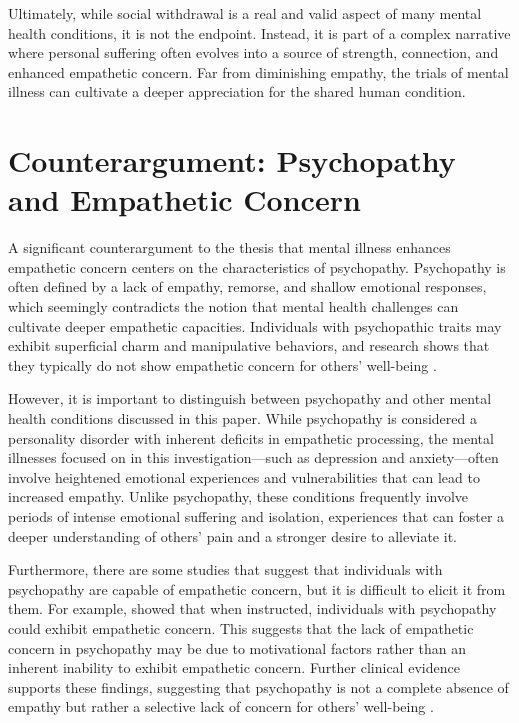 \documentclass[stu]{apa7}
\begin{document}
Ultimately, while social withdrawal is a real and valid aspect of many mental health conditions, it is not the endpoint. Instead, it is part of a complex narrative where personal suffering often evolves into a source of strength, connection, and enhanced empathetic concern. Far from diminishing empathy, the trials of mental illness can cultivate a deeper appreciation for the shared human condition.

\section{Counterargument: Psychopathy and Empathetic Concern}

A significant counterargument to the thesis that mental illness enhances empathetic concern centers on the characteristics of psychopathy. Psychopathy is often defined by a lack of empathy, remorse, and shallow emotional responses, which seemingly contradicts the notion that mental health challenges can cultivate deeper empathetic capacities. Individuals with psychopathic traits may exhibit superficial charm and manipulative behaviors, and research shows that they typically do not show empathetic concern for others' well-being \parencite{maibom_empathy_2020}.

However, it is important to distinguish between psychopathy and other mental health conditions discussed in this paper. While psychopathy is considered a personality disorder with inherent deficits in empathetic processing, the mental illnesses focused on in this investigation—such as depression and anxiety—often involve heightened emotional experiences and vulnerabilities that can lead to increased empathy. Unlike psychopathy, these conditions frequently involve periods of intense emotional suffering and isolation, experiences that can foster a deeper understanding of others' pain and a stronger desire to alleviate it.

Furthermore, there are some studies that suggest that individuals with psychopathy are capable of empathetic concern, but it is difficult to elicit it from them. For example, \textcite{meffert_reduced_2013} showed that when instructed, individuals with psychopathy could exhibit empathetic concern. This suggests that the lack of empathetic concern in psychopathy may be due to motivational factors rather than an inherent inability to exhibit empathetic concern. Further clinical evidence supports these findings, suggesting that psychopathy is not a complete absence of empathy but rather a selective lack of concern for others' well-being \parencite{pickard_sympathy_2017}.
\end{document}
